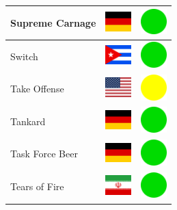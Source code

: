 \documentclass[12pt, a4paper, twoside]{report}
\begin{document}
\begin{center}
\begin{longtable}{|p{5cm}|p{2cm}|p{2cm}|}
 Supreme Carnage                                            & \includegraphics[width=1cm]{../4x3/de} &   \includegraphics[width=1cm]{../likes/y} \\ \hline
 Switch                                                     & \includegraphics[width=1cm]{../4x3/cu} &   \includegraphics[width=1cm]{../likes/y} \\ \hline
 Take Offense                                               & \includegraphics[width=1cm]{../4x3/us} &   \includegraphics[width=1cm]{../likes/m} \\ \hline
 Tankard                                                    & \includegraphics[width=1cm]{../4x3/de} &   \includegraphics[width=1cm]{../likes/y} \\ \hline
 Task Force Beer                                            & \includegraphics[width=1cm]{../4x3/de} &   \includegraphics[width=1cm]{../likes/y} \\ \hline
 Tears of Fire                                              & \includegraphics[width=1cm]{../4x3/ir} &   \includegraphics[width=1cm]{../likes/y} \\ \hline

\end{longtable}
\end{center}
\end{document}
